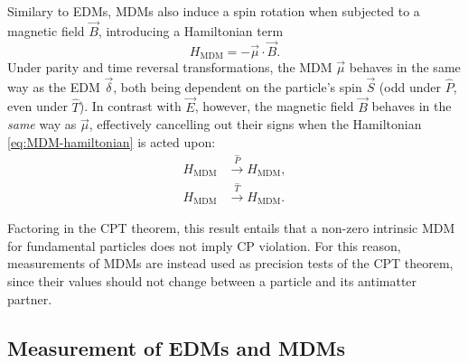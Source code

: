Similary to EDMs, MDMs also induce a spin rotation when subjected to a magnetic field $\vec{B}$, introducing a Hamiltonian term
\begin{equation}
H_\text{MDM} = - \vec{\mu} \cdot \vec{B} .
\label{eq:MDM-hamiltonian}
\end{equation}
Under parity and time reversal transformations, the MDM $\vec{\mu}$ behaves in the same way as the EDM $\vec{\delta}$, both being dependent on the particle's spin $\vec{S}$ (odd under $\hat{P}$, even under $\hat{T}$).
In contrast with $\vec{E}$, however, the magnetic field $\vec{B}$ behaves in the \textit{same} way as $\vec{\mu}$, effectively cancelling out their signs when the Hamiltonian \eqref{eq:MDM-hamiltonian} is acted upon:
\begin{align}
H_\text{MDM} &\xrightarrow{\hat{P}} H_\text{MDM},
\label{eq:MDM-hamiltonian-under-P} \\
H_\text{MDM} &\xrightarrow{\hat{T}} H_\text{MDM}.
\label{eq:MDM-hamiltonian-under-T}
\end{align}

Factoring in the CPT theorem, this result entails that a non-zero intrinsic MDM for fundamental particles does not imply CP violation.
For this reason, measurements of MDMs are instead used as precision tests of the CPT theorem, since their values should not change between a particle and its antimatter partner.

\subsection{Measurement of EDMs and MDMs}
\label{sec:emdm-measurement}


